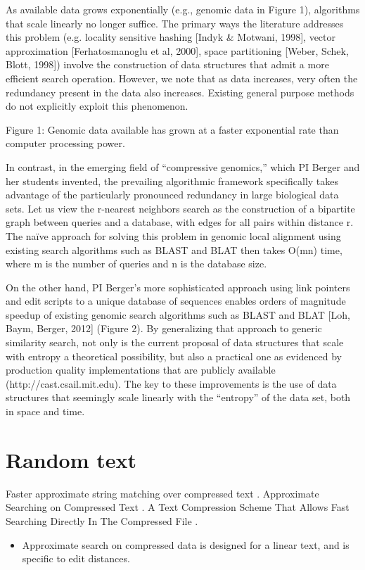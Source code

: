 \documentclass{amsbook}
\theoremstyle{definition}
\theoremstyle{remark}
\numberwithin{equation}{section}
\begin{document}
As available data grows exponentially (e.g., genomic data in Figure 1), algorithms that scale linearly no longer suffice.
The primary ways the literature addresses this problem (e.g.
locality sensitive hashing [Indyk \& Motwani, 1998], vector approximation [Ferhatosmanoglu et al, 2000], space partitioning [Weber, Schek, Blott, 1998]) involve the construction of data structures that admit a more efficient search operation.
However, we note that as data increases, very often the redundancy present in the data also increases.
Existing general purpose methods do not explicitly exploit this phenomenon.

Figure 1: Genomic data available has grown at a faster exponential rate than computer processing power.

In contrast, in the emerging field of “compressive genomics,” which PI Berger and her students invented, the prevailing algorithmic framework specifically takes advantage of the particularly pronounced redundancy in large biological data sets.
Let us view the r-nearest neighbors search as the construction of a bipartite graph between queries and a database, with edges for all pairs within distance r.
The naïve approach for solving this problem in genomic local alignment using existing search algorithms such as BLAST and BLAT then takes O(mn) time, where m is the number of queries and n is the database size.

On the other hand, PI Berger’s more sophisticated approach using link pointers and edit scripts to a unique database of sequences enables orders of magnitude speedup of existing genomic search algorithms such as BLAST and BLAT [Loh, Baym, Berger, 2012] (Figure 2).
By generalizing that approach to generic similarity search, not only is the current proposal of data structures that scale with entropy a theoretical possibility, but also a practical one as evidenced by production quality implementations that are publicly available (http://cast.csail.mit.edu).
The key to these improvements is the use of data structures that seemingly scale linearly with the “entropy” of the data set, both in space and time.

\section{Random text}

Faster approximate string matching over compressed text \cite{navarro2001faster}.
Approximate Searching on Compressed Text \cite{perez2005approximate}.
A Text Compression Scheme That Allows Fast Searching Directly In The Compressed File \cite{Manber93atext}.
\begin{itemize}
\item Approximate search on compressed data is designed for a linear text, and is specific to edit distances.
\end{itemize}
\end{document}
